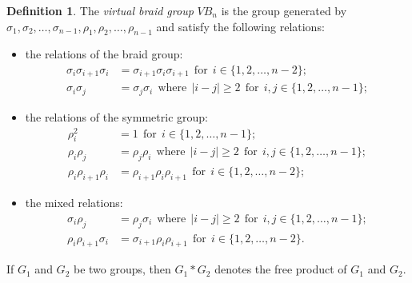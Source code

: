 \documentclass[11 pt, reqno]{amsart}
\theoremstyle{definition}
\newtheorem{definition}[theorem]{Definition}
\numberwithin{equation}{subsection}
\begin{document}
\begin{definition}
The \textit{virtual braid group} $VB _n$ is the group generated by
\linebreak $\sigma_1, \sigma_2, \ldots, \sigma_{n-1}, \rho_1, \rho_2, \ldots, \rho_{n-1}$ and satisfy the following relations:

\begin{itemize}
\item the relations of the braid group:
\begin{align*}
\sigma_i \sigma_{i+1} \sigma_i &= \sigma_{i+1} \sigma_i \sigma_{i+1} ~~\textrm{for}~~i \in \{1,2,\ldots,n-2\};\\
\sigma_i \sigma_j &= \sigma_j \sigma_i ~~\textrm{where}~~ |i-j| \geq 2~~ \textrm{for}~~i,j \in \{1,2,\ldots, n-1\};
\end{align*}

\item the relations of the symmetric group:
\begin{align*}
\rho_i ^2 &=1 ~~\textrm{for}~~i \in \{1,2,\ldots,n-1\};\\
\rho_i \rho_j&= \rho_j \rho_i ~~\textrm{where}~~ |i-j| \geq 2 ~~\textrm{for}~~i,j \in \{1,2,\ldots, n-1\};\\
\rho_i \rho_{i+1} \rho_{i} &= \rho_{i+1} \rho_{i} \rho_{i+1} ~~\textrm{for}~~ i \in \{1,2,\ldots, n-2\};
\end{align*}

\item the mixed relations:
\begin{align*}
\sigma_i \rho_j &= \rho_j \sigma_i~~\textrm{where}~~ |i-j| \geq 2~~\textrm{for}~~i,j \in \{1,2,\ldots,n-1\};\\
\rho_i \rho_{i+1} \sigma_i &= \sigma_{i+1} \rho_i \rho_{i+1}~~\textrm{for}~~ i \in \{1,2,\ldots,n-2\}.
\end{align*}

\end{itemize}

\end{definition}
\par

If $G_1$ and $G_2$ be two groups, then $G_1 * G_2$ denotes the free product of $G_1$ and $G_2$.
\par 
\end{document}
